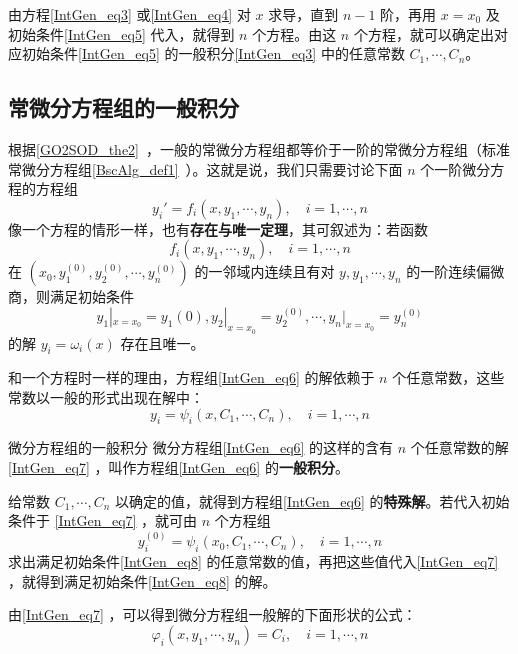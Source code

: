 由方程\autoref{IntGen_eq3} 或\autoref{IntGen_eq4} 对 $x$ 求导，直到 $n-1$ 阶，再用 $x=x_0$ 及初始条件\autoref{IntGen_eq5} 代入，就得到 $n$ 个方程。由这 $n$ 个方程，就可以确定出对应初始条件\autoref{IntGen_eq5} 的一般积分\autoref{IntGen_eq3} 中的任意常数 $C_1,\cdots,C_n$。
\subsection{常微分方程组的一般积分}
根据\autoref{GO2SOD_the2}~，一般的常微分方程组都等价于一阶的常微分方程组（标准常微分方程组\autoref{BscAlg_def1}~）。这就是说，我们只需要讨论下面 $n$ 个一阶微分方程的方程组
\begin{equation}\label{IntGen_eq6}
y_i'=f_i(x,y_1,\cdots,y_n),\quad i=1,\cdots,n
\end{equation}
像一个方程的情形一样，也有\textbf{存在与唯一定理}，其可叙述为：若函数
\begin{equation}
f_i(x,y_1,\cdots,y_n),\quad i=1,\cdots,n
\end{equation}
在 $(x_0,y_1^{(0)},y_2^{(0)},\cdots,y_n^{(0)})$ 的一邻域内连续且有对 $y,y_1,\cdots,y_n$ 的一阶连续偏微商，则满足初始条件
\begin{equation}\label{IntGen_eq8}
y_1|_{x=x_0}=y_1{(0)},y_2|_{x=x_0}=y_2^{(0)},\cdots,y_n|_{x=x_0}=y_n^{(0)}
\end{equation}
的解 $y_i=\omega_i(x)$ 存在且唯一。

和一个方程时一样的理由，方程组\autoref{IntGen_eq6} 的解依赖于 $n$ 个任意常数，这些常数以一般的形式出现在解中：
\begin{equation}\label{IntGen_eq7}
y_i=\psi_i(x,C_1,\cdots,C_n),\quad i=1,\cdots,n
\end{equation}
\begin{definition}{微分方程组的一般积分}
微分方程组\autoref{IntGen_eq6} 的这样的含有 $n$ 个任意常数的解\autoref{IntGen_eq7} ，叫作方程组\autoref{IntGen_eq6} 的\textbf{一般积分}。
\end{definition}
给常数 $C_1,\cdots,C_n$ 以确定的值，就得到方程组\autoref{IntGen_eq6} 的\textbf{特殊解}。若代入初始条件于 \autoref{IntGen_eq7} ，就可由 $n$ 个方程组
\begin{equation}
y_i^{(0)}=\psi_i(x_0,C_1,\cdots,C_n),\quad i=1,\cdots,n
\end{equation}
求出满足初始条件\autoref{IntGen_eq8} 的任意常数的值，再把这些值代入\autoref{IntGen_eq7} ，就得到满足初始条件\autoref{IntGen_eq8} 的解。

由\autoref{IntGen_eq7} ，可以得到微分方程组一般解的下面形状的公式：
\begin{equation}\label{IntGen_eq9}
\varphi_i(x,y_1,\cdots,y_n)=C_i,\quad i=1,\cdots,n
\end{equation}

